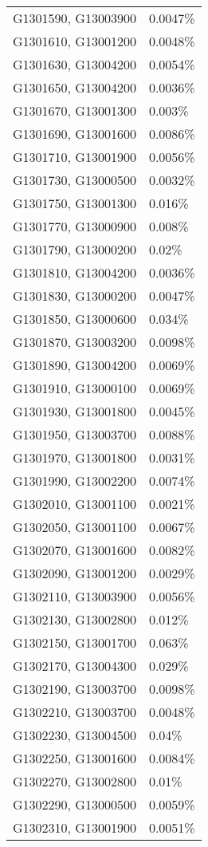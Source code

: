 \begin{longtable}[]{@{}ll@{}}
G1301590, G13003900 & 0.0047\% \\
G1301610, G13001200 & 0.0048\% \\
G1301630, G13004200 & 0.0054\% \\
G1301650, G13004200 & 0.0036\% \\
G1301670, G13001300 & 0.003\% \\
G1301690, G13001600 & 0.0086\% \\
G1301710, G13001900 & 0.0056\% \\
G1301730, G13000500 & 0.0032\% \\
G1301750, G13001300 & 0.016\% \\
G1301770, G13000900 & 0.008\% \\
G1301790, G13000200 & 0.02\% \\
G1301810, G13004200 & 0.0036\% \\
G1301830, G13000200 & 0.0047\% \\
G1301850, G13000600 & 0.034\% \\
G1301870, G13003200 & 0.0098\% \\
G1301890, G13004200 & 0.0069\% \\
G1301910, G13000100 & 0.0069\% \\
G1301930, G13001800 & 0.0045\% \\
G1301950, G13003700 & 0.0088\% \\
G1301970, G13001800 & 0.0031\% \\
G1301990, G13002200 & 0.0074\% \\
G1302010, G13001100 & 0.0021\% \\
G1302050, G13001100 & 0.0067\% \\
G1302070, G13001600 & 0.0082\% \\
G1302090, G13001200 & 0.0029\% \\
G1302110, G13003900 & 0.0056\% \\
G1302130, G13002800 & 0.012\% \\
G1302150, G13001700 & 0.063\% \\
G1302170, G13004300 & 0.029\% \\
G1302190, G13003700 & 0.0098\% \\
G1302210, G13003700 & 0.0048\% \\
G1302230, G13004500 & 0.04\% \\
G1302250, G13001600 & 0.0084\% \\
G1302270, G13002800 & 0.01\% \\
G1302290, G13000500 & 0.0059\% \\
G1302310, G13001900 & 0.0051\% \\

\end{longtable}
